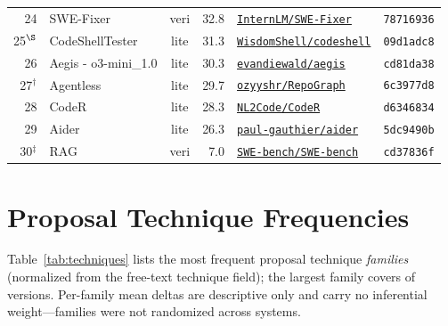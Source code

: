 \begin{table}[h]
\begin{tabular}{rlcrlc}
24 & SWE-Fixer & veri & 32.8 & \href{https://github.com/InternLM/SWE-Fixer}{\texttt{InternLM/SWE-Fixer}} & \texttt{78716936} \\
25$^{\S}$ & CodeShellTester & lite & 31.3 & \href{https://github.com/WisdomShell/codeshell}{\texttt{WisdomShell/codeshell}} & \texttt{09d1adc8} \\
26 & Aegis - o3-mini\_1.0 & lite & 30.3 & \href{https://github.com/evandiewald/aegis}{\texttt{evandiewald/aegis}} & \texttt{cd81da38} \\
27$^{\dagger}$ & Agentless & lite & 29.7 & \href{https://github.com/ozyyshr/RepoGraph}{\texttt{ozyyshr/RepoGraph}} & \texttt{6c3977d8} \\
28 & CodeR & lite & 28.3 & \href{https://github.com/NL2Code/CodeR}{\texttt{NL2Code/CodeR}} & \texttt{d6346834} \\
29 & Aider & lite & 26.3 & \href{https://github.com/paul-gauthier/aider}{\texttt{paul-gauthier/aider}} & \texttt{5dc9490b} \\
30$^{\ddagger}$ & RAG & veri & 7.0 & \href{https://github.com/SWE-bench/SWE-bench}{\texttt{SWE-bench/SWE-bench}} & \texttt{cd37836f} \\
\bottomrule
\end{tabular}
\end{table}

\clearpage
\section{Proposal Technique Frequencies}
\label{app:tech}
Table~\ref{tab:techniques} lists the most frequent proposal technique
\emph{families} (normalized from the free-text technique field); the largest
family covers \swTechTopN{} of \swVersions{} versions. Per-family mean deltas
are descriptive only and carry no inferential weight---families were not
randomized across systems.

\begin{table}[h]\centering
\caption{Most frequent proposal technique families over all \swVersions{}
why-records; $n$ is the Versions column. Descriptive only: families were not
randomized, so the mean $\Delta$ (\textsc{rubric}) carries no causal claim.}
\label{tab:techniques}\footnotesize
\setlength{\tabcolsep}{4pt}

\end{table}

\clearpage

